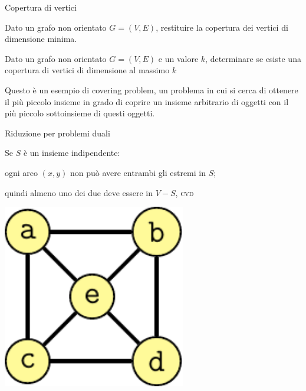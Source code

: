\begin{frame}{Copertura di vertici}

\vspace{-9pt}
\begin{myboxtitle}
Dato un grafo non orientato $G=(V,E)$, restituire la copertura dei vertici
di dimensione minima.
\end{myboxtitle}

\begin{myboxtitle}
Dato un grafo non orientato $G=(V,E)$ e un valore $k$, determinare se
esiste una copertura di vertici di dimensione al massimo $k$
\end{myboxtitle}

\begin{myboxtitle}
Questo è un esempio di \alert{covering problem}, un problema in cui si cerca
di ottenere il più piccolo insieme in grado di coprire un insieme 
arbitrario di oggetti con il più piccolo sottoinsieme di questi oggetti.
\end{myboxtitle}

\end{frame}

\begin{frame}{Riduzione per problemi duali}

\vspace{-9pt}
Se $S$ è un insieme indipendente:
\BI
\item ogni arco $(x,y)$ non può avere entrambi gli estremi in $S$; 
\item quindi almeno uno dei due deve essere in $V-S$, \textsc{cvd}
\EI

\begin{center}
\includegraphics[width=0.6\textwidth,page=3]{independent.pdf}
\end{center}

\end{frame}

